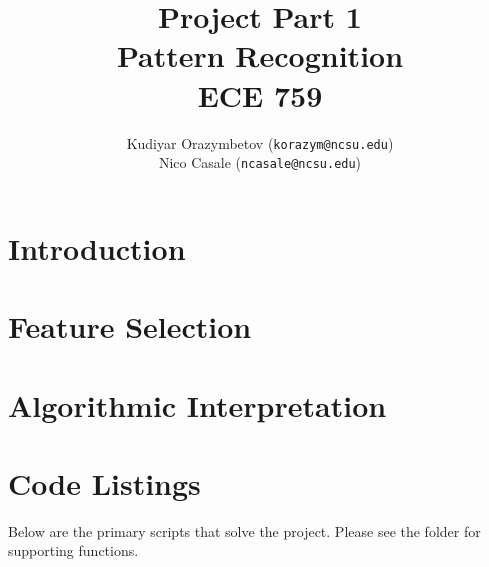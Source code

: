 \documentclass[]{ncmathy}
\newcommand{\theassignment}{Project Part 1}
\newcommand{\thecourse}{Pattern Recognition\\ECE 759}
\begin{document}
\title{\theassignment\\\thecourse}
\author{Kudiyar Orazymbetov (\texttt{korazym@ncsu.edu})\\Nico Casale (\texttt{ncasale@ncsu.edu})}

\makeFancyTitle

\tableofcontents
\listoffigures
\lstlistoflistings

\pagebreak

\section{Introduction} 
	

\section{Feature Selection}
	

\section{Algorithmic Interpretation}
	

\section{Code Listings}

Below are the primary scripts that solve the project. Please see the
 folder for supporting functions.

%
\end{document}
